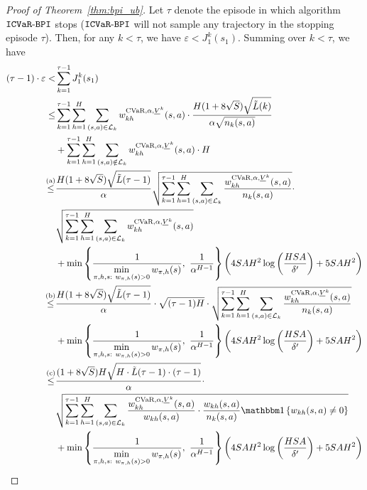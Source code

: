 \begin{proof}[Proof of Theorem~\ref{thm:bpi_ub}]
	Let $\tau$ denote the episode in which algorithm $\mathtt{ICVaR\mbox{-}BPI}$ stops ($\mathtt{ICVaR\mbox{-}BPI}$ will not sample any trajectory in the stopping episode $\tau$). 
	Then, for any $k<\tau$, we have $\varepsilon < J^k_1(s_1) $. Summing over $k<\tau$, we have
	\begin{align*}
		(\tau-1) \cdot \varepsilon < & \sum_{k=1}^{\tau-1} J^k_1(s_1) 
		\\
		\leq & \sum_{k=1}^{\tau-1} \sum_{h=1}^{H} \sum_{(s,a) \in \cL_k} w^{\cvar,\alpha,\underline{V}^k}_{kh}(s,a) \cdot \frac{H (1+8\sqrt{S}) \sqrt{\tilde{L}(k)}}{\alpha \sqrt{n_k(s,a)}} \\&+ \sum_{k=1}^{\tau-1} \sum_{h=1}^{H} \sum_{(s,a) \notin \cL_k} w^{\cvar,\alpha,\underline{V}^k}_{kh}(s,a) \cdot H
		\\
		\overset{\textup{(a)}}{\leq} & \frac{H (1+8\sqrt{S}) \sqrt{\tilde{L}(\tau-1)}}{\alpha} \sqrt{\sum_{k=1}^{\tau-1} \sum_{h=1}^{H} \sum_{(s,a) \in \cL_k}  \frac{w^{\cvar,\alpha,\underline{V}^k}_{kh}(s,a)}{n_k(s,a)}} \cdot \\& \sqrt{\sum_{k=1}^{\tau-1} \sum_{h=1}^{H} \sum_{(s,a) \in \cL_k}  w^{\cvar,\alpha,\underline{V}^k}_{kh}(s,a)}
		\\& + \min \lbr{\frac{ 1 }{\min \limits_{\begin{subarray}{c}\pi,h,s:\  w_{\pi,h}(s)>0\end{subarray}} w_{\pi,h}(s)},\ \frac{1}{\alpha^{H-1}}}  \sbr{ 4SAH^2 \log\sbr{\frac{HSA}{\delta'}} + 5SAH^2 }
		\\
		\overset{\textup{(b)}}{\leq} & \frac{H (1+8\sqrt{S}) \sqrt{\tilde{L}(\tau-1)}}{\alpha} \cdot \sqrt{(\tau-1)H} \cdot \sqrt{\sum_{k=1}^{\tau-1} \sum_{h=1}^{H} \sum_{(s,a) \in \cL_k}  \frac{w^{\cvar,\alpha,\underline{V}^k}_{kh}(s,a)}{n_k(s,a)}}  
		\\& + \min \lbr{\frac{ 1 }{\min \limits_{\begin{subarray}{c}\pi,h,s:\  w_{\pi,h}(s)>0\end{subarray}} w_{\pi,h}(s)},\ \frac{1}{\alpha^{H-1}}}  \sbr{ 4SAH^2 \log\sbr{\frac{HSA}{\delta'}} + 5SAH^2 }
		\\
		\overset{\textup{(c)}}{\leq} & \frac{(1+8\sqrt{S}) H \sqrt{H \cdot \tilde{L}(\tau-1) \cdot (\tau-1)} }{\alpha} \cdot \\& \sqrt{\sum_{k=1}^{\tau-1} \sum_{h=1}^{H} \sum_{(s,a) \in \cL_k}  \frac{w^{\cvar,\alpha,\underline{V}^k}_{kh}(s,a)}{w_{kh}(s,a)} \cdot \frac{w_{kh}(s,a)}{n_k(s,a)} \indicator{w_{kh}(s,a) \neq 0} } 
		\\& + \min \lbr{\frac{ 1 }{\min \limits_{\begin{subarray}{c}\pi,h,s:\  w_{\pi,h}(s)>0\end{subarray}} w_{\pi,h}(s)},\ \frac{1}{\alpha^{H-1}}}  \sbr{ 4SAH^2 \log\sbr{\frac{HSA}{\delta'}} + 5SAH^2 }

\end{align*}
\end{proof}
